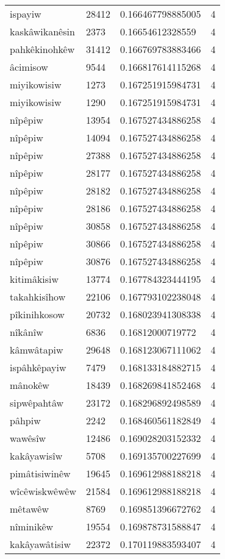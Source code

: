 \begin{longtable}{llll}
ispayiw & 28412 & 0.166467798885005 & 4 \\
kaskâwikanêsin & 2373 & 0.16654612328559 & 4 \\
pahkêkinohkêw & 31412 & 0.166769783883466 & 4 \\
âcimisow & 9544 & 0.166817614115268 & 4 \\
miyikowisiw & 1273 & 0.167251915984731 & 4 \\
miyikowisiw & 1290 & 0.167251915984731 & 4 \\
nîpêpiw & 13954 & 0.167527434886258 & 4 \\
nîpêpiw & 14094 & 0.167527434886258 & 4 \\
nîpêpiw & 27388 & 0.167527434886258 & 4 \\
nîpêpiw & 28177 & 0.167527434886258 & 4 \\
nîpêpiw & 28182 & 0.167527434886258 & 4 \\
nîpêpiw & 28186 & 0.167527434886258 & 4 \\
nîpêpiw & 30858 & 0.167527434886258 & 4 \\
nîpêpiw & 30866 & 0.167527434886258 & 4 \\
nîpêpiw & 30876 & 0.167527434886258 & 4 \\
kitimâkisiw & 13774 & 0.167784323444195 & 4 \\
takahkisîhow & 22106 & 0.167793102238048 & 4 \\
pîkinihkosow & 20732 & 0.168023941308338 & 4 \\
nîkânîw & 6836 & 0.16812000719772 & 4 \\
kâmwâtapiw & 29648 & 0.168123067111062 & 4 \\
ispâhkêpayiw & 7479 & 0.168133184882715 & 4 \\
mânokêw & 18439 & 0.168269841852468 & 4 \\
sipwêpahtâw & 23172 & 0.168296892498589 & 4 \\
pâhpiw & 2242 & 0.168460561182849 & 4 \\
wawêsîw & 12486 & 0.169028203152332 & 4 \\
kakâyawisîw & 5708 & 0.169135700227699 & 4 \\
pimâtisiwinêw & 19645 & 0.169612988188218 & 4 \\
wîcêwiskwêwêw & 21584 & 0.169612988188218 & 4 \\
mêtawêw & 8769 & 0.169851396672762 & 4 \\
nîminikêw & 19554 & 0.169878731588847 & 4 \\
kakâyawâtisiw & 22372 & 0.170119883593407 & 4 \\

\end{longtable}
